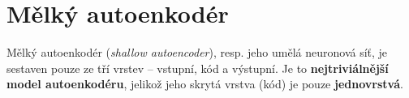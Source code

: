 \section{Mělký autoenkodér}
\label{sec:shallow_autoncoder}
Mělký autoenkodér (\emph{shallow autoencoder}), resp. jeho umělá neuronová síť, je sestaven pouze ze tří vrstev – vstupní, kód a výstupní.
Je to \textbf{nejtriviálnější model autoenkodéru}, jelikož jeho skrytá vrstva (kód) je pouze \textbf{jednovrstvá}. \cite{Charte2018}
